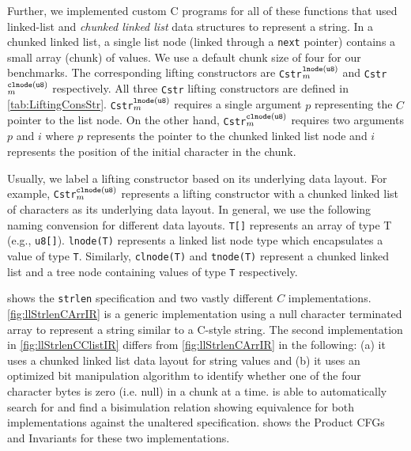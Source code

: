 Further, we implemented
custom C programs for all of these functions that used
linked-list
and {\em chunked linked list} data structures
to represent a string.
In a chunked linked list, a single list node (linked
through a {\tt next} pointer)
contains a small array (chunk) of values.
We use a default chunk size of four for our
benchmarks.
The corresponding lifting constructors are {\tt Cstr}$^{\tt lnode(u8)}_m$
and {\tt Cstr}$^{\tt clnode(u8)}_m$ respectively.
All three {\tt Cstr} lifting constructors are defined in \cref{tab:LiftingConsStr}.
{\tt Cstr}$^{\tt lnode(u8)}_m$ requires a single
argument $p$ representing the $C$ pointer to the list node.
On the other hand, {\tt Cstr}$^{\tt clnode(u8)}_m$ requires two arguments $p$
and $i$ where $p$ represents the pointer to the chunked linked list node
and $i$ represents the position of the initial character in the chunk.

Usually, we label a lifting constructor based on its underlying data layout.
For example, {\tt Cstr}$^{\tt clnode(u8)}_m$ represents a lifting constructor
with a chunked linked list of characters as its underlying data layout.
In general, we use the following naming convension for different data layouts.
{\tt T[]} represents an array of type T (e.g., {\tt u8[]}).
{\tt lnode(T)} represents a  linked list node type which encapsulates a value of type {\tt T}.
Similarly, {\tt clnode(T)} and {\tt tnode(T)} represent a chunked linked list and a tree node
containing values of type {\tt T} respectively.



 shows the {\tt strlen} specification and two vastly
different $C$ implementations. \cref{fig:llStrlenCArrIR} is a generic implementation
using a null character terminated array to represent a string similar to a C-style string.
The second implementation in \cref{fig:llStrlenCClistIR} differs from \cref{fig:llStrlenCArrIR}
in the following: (a) it uses a chunked linked list data layout for string values
and (b) it uses an optimized bit manipulation algorithm to identify whether one of the four
character bytes is zero (i.e. null) in a chunk at a time. \toolName{} is able to automatically
search for and find a bisimulation relation showing equivalence
for both implementations against the unaltered specification.
 shows the Product CFGs and Invariants for these two implementations.



